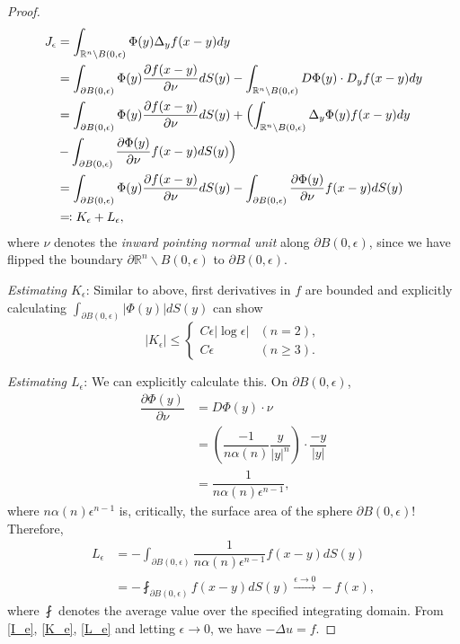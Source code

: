 \documentclass[openany, amssymb, psamsfonts]{amsart}
\theoremstyle{definition}
\numberwithin{equation}{section}
\newcommand{\bbr}{\mathbb{R}}
\begin{document}
\begin{proof}
\begin{align*}
    J_\epsilon &= \int_{\bbr^n \backslash B(0, \epsilon)} \Phi(y) \Delta_y f(x - y)dy \\
    &= \int_{\partial B(0, \epsilon)} \Phi(y) \dfrac{\partial f(x - y)}{\partial \nu} dS(y)  - \int_{\bbr^n \backslash B(0, \epsilon)} D\Phi(y) \cdot D_y f(x - y)dy \\
    &= \int_{\partial B(0, \epsilon)} \Phi(y) \dfrac{\partial f(x - y)}{\partial \nu} dS(y) + \Bigl(\int_{\bbr^n \backslash B(0, \epsilon)} \Delta_y \Phi(y) f(x - y)dy \\
    & - \int_{\partial B(0, \epsilon)} \dfrac{\partial \Phi(y)}{\partial \nu} f(x - y) dS(y) \Bigr) \\
    & = \int_{\partial B(0, \epsilon)} \Phi(y) \dfrac{\partial f(x - y)}{\partial \nu} dS(y) - \int_{\partial B(0, \epsilon)} \dfrac{\partial \Phi(y)}{\partial \nu} f(x - y) dS(y) \\
    & \eqqcolon K_\epsilon + L_\epsilon ,
\end{align*}
where $\nu$ denotes the \textit{inward pointing normal unit} along $\partial B(0, \epsilon)$, since we have flipped the boundary $\partial \bbr^n \backslash B(0, \epsilon)$ to $\partial B(0, \epsilon)$.

\textit{Estimating $K_\epsilon$}: Similar to above, first derivatives in $f$ are bounded and explicitly calculating $\int_{\partial B(0, \epsilon)} |\Phi (y)| dS(y)$ can show \begin{equation} \label{K_e}
    |K_\epsilon| \leq \begin{cases}
        C\epsilon |\log \epsilon| & (n=2),\\
        C \epsilon & (n \geq 3).
    \end{cases}
\end{equation}

\textit{Estimating $L_\epsilon$}: We can explicitly calculate this. On $\partial B(0, \epsilon)$, \begin{align*}
    \dfrac{\partial \Phi (y)}{\partial \nu} &= D\Phi(y) \cdot \nu \\
    &= \left( \dfrac{-1}{n \alpha(n)} \dfrac{y}{|y|^n} \right) \cdot \dfrac{-y}{|y|} \\
    &= \dfrac{1}{n \alpha(n) \epsilon^{n-1}},
\end{align*}
where $n \alpha(n) \epsilon^{n-1}$ is, critically, the surface area of the sphere $\partial B(0, \epsilon)$! Therefore, 
\begin{align} 
    L_\epsilon &= - \int_{\partial B(0, \epsilon)} \dfrac{1}{n \alpha(n) \epsilon^{n-1}} f(x - y) dS(y) \nonumber \\
    &= - \fint_{\partial B(0, \epsilon)} f(x-y) dS(y) \xrightarrow{\epsilon \to 0} -f(x), \label{L_e}
\end{align}
where $\fint$ denotes the average value over the specified integrating domain. From \eqref{I_e}, \eqref{K_e}, \eqref{L_e} and letting $\epsilon \to 0$, we have $-\Delta u = f$.
\end{proof}
\end{document}
